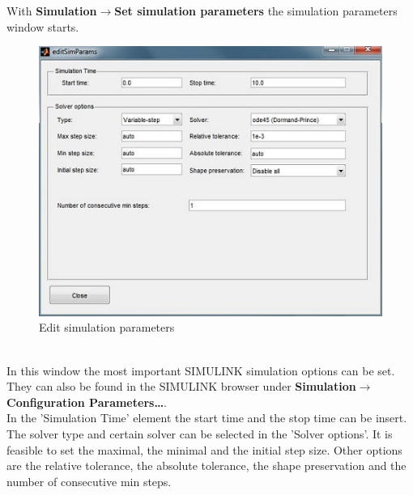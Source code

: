 \documentclass[12pt]{report}
\begin{document}
With \textbf{Simulation$\rightarrow$Set simulation parameters} the simulation parameters window starts.\\
\begin{figure}[h]
\centering
\includegraphics[scale=.9]{editsimpara}
\caption{Edit simulation parameters}
\label{FIG:abb22}
\end{figure}
\\
In this window the most important SIMULINK simulation options can be set. They can also be found in the SIMULINK browser under \textbf{Simulation$\rightarrow$Configuration Parameters\dots}.\\
In the 'Simulation Time' element the start time and the stop time can be insert. The solver type and certain solver can be selected in the 'Solver options'. It is feasible to set the maximal, the minimal and the initial step size. Other options are the relative tolerance, the absolute tolerance, the shape preservation and the number of consecutive min steps.\\
\\
\end{document}
